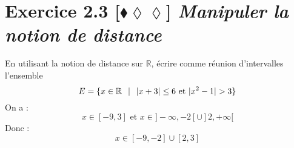 \documentclass[10pt]{article}
\begin{document}
\section*{Exercice 2.3 [$\blacklozenge\lozenge\lozenge$] \emph{Manipuler la notion de distance}}
\begin{tcolorbox}[enhanced, width=6in, center, size=fbox, fontupper=\large, drop shadow southwest]
    En utilisant la notion de distance sur $\mathbb{R}$, écrire comme réunion d'intervalles l'ensemble
    \begin{equation*}
        E=\{x\in\mathbb{R} \hspace{0.25cm} | \hspace{0.25cm} |x+3| \leq 6 \text{ et } |x^2-1| > 3\}
    \end{equation*}
    On a :
    \begin{equation*}
        x\in[-9,3] \text{ et } x\in]-\infty, -2[\cup]2,+\infty[
    \end{equation*}
    Donc :
    \begin{equation*}
        x\in[-9,-2]\cup[2,3]
    \end{equation*}
\end{tcolorbox}
\end{document}
